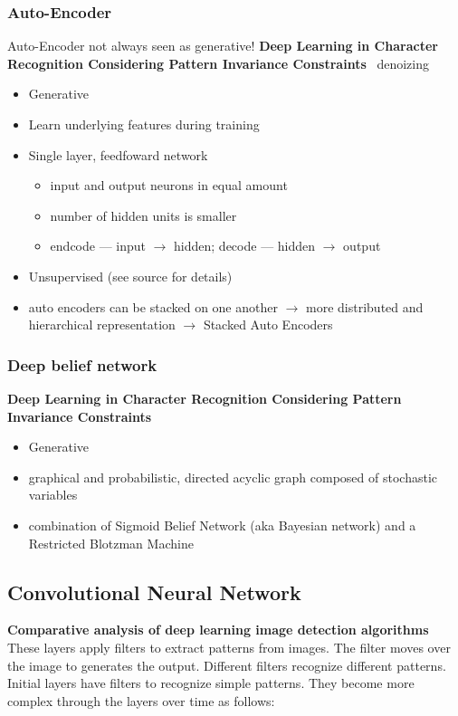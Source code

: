 \subsubsection{Auto-Encoder}
Auto-Encoder not always seen as generative!
\textbf{Deep Learning in Character Recognition Considering Pattern Invariance
Constraints}~\cite{oyedotun_deep_2015}
denoizing
\begin{itemize}
    \item Generative
    \item Learn underlying features during training
    \item Single layer, feedfoward network
        \begin{itemize}
            \item input and output neurons in equal amount
            \item number of hidden units is smaller
            \item endcode --- input $\rightarrow$ hidden; decode --- hidden $\rightarrow$ output
        \end{itemize}
    \item Unsupervised (see source for details)
    \item auto encoders can be stacked on one another $\rightarrow$ more distributed and hierarchical
        representation $\rightarrow$ Stacked Auto Encoders
\end{itemize}

\subsubsection{Deep belief network}
\textbf{Deep Learning in Character Recognition Considering Pattern Invariance
Constraints}~\cite{oyedotun_deep_2015}
\begin{itemize}
    \item Generative
    \item graphical and probabilistic, directed acyclic graph composed of stochastic variables
    \item combination of Sigmoid Belief Network (aka Bayesian network) and a Restricted Blotzman Machine
\end{itemize}


\subsection{Convolutional Neural Network}
\textbf{Comparative analysis of deep learning image detection
algorithms}~\cite{srivastava_comparative_2021}
These layers apply filters to extract patterns from images. The filter moves over the image to generates the output. Different filters recognize different patterns. Initial layers have filters to recognize simple patterns. They become more complex through the layers over time as follows:

